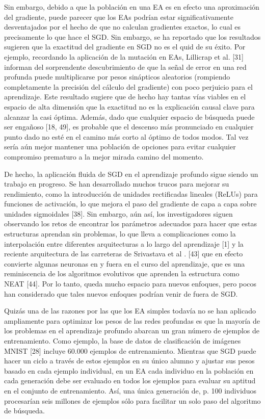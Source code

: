 Sin embargo, debido a que la población en una EA es en efecto una aproximación del gradiente, puede parecer que los EAs podrían estar significativamente desventajados por el hecho de que no calculan gradientes exactos, lo cual es precisamente lo que hace el SGD. Sin embargo, se ha reportado que los resultados sugieren que la exactitud del gradiente en SGD no es el quid de su éxito. Por ejemplo, recordando la aplicación de la mutación en EAs, Lillicrap et al. [31] informan del sorprendente descubrimiento de que la señal de error en una red profunda puede multiplicarse por pesos sinápticos aleatorios (rompiendo completamente la precisión del cálculo del gradiente) con poco perjuicio para el aprendizaje. Este resultado sugiere que de hecho hay tantas vías viables en el espacio de alta dimensión que la exactitud no es la explicación causal clave para alcanzar la casi óptima. Además, dado que cualquier espacio de búsqueda puede ser engañoso [18, 49], es probable que el descenso más pronunciado en cualquier punto dado no esté en el camino más corto al óptimo de todos modos. Tal vez sería aún mejor mantener una población de opciones para evitar cualquier compromiso prematuro a la mejor mirada camino del momento.

De hecho, la aplicación fluida de SGD en el aprendizaje profundo sigue siendo un trabajo en progreso. Se han desarrollado muchos trucos para mejorar su rendimiento, como la introducción de unidades rectificadas lineales (ReLUs) para funciones de activación, lo que mejora el paso del gradiente de capa a capa sobre unidades sigmoidales [38]. Sin embargo, aún así, los investigadores siguen observando los retos de encontrar los parámetros adecuados para hacer que estas estructuras aprendan sin problemas, lo que lleva a complicaciones como la interpolación entre diferentes arquitecturas a lo largo del aprendizaje [1] y la reciente arquitectura de las carreteras de Srivastava et al . [43] que en efecto convierte algunas neuronas en y fuera en el curso del aprendizaje, que es una reminiscencia de los algoritmos evolutivos que aprenden la estructura como NEAT [44]. Por lo tanto, queda mucho espacio para nuevos enfoques, pero pocos han considerado que tales nuevos enfoques podrían venir de fuera de SGD.

Quizás una de las razones por las que los EA simples todavía no se han aplicado ampliamente para optimizar los pesos de las redes profundas es que la mayoría de los problemas en el aprendizaje profundo abarcan un gran número de ejemplos de entrenamiento. Como ejemplo, la base de datos de clasificación de imágenes MNIST [28] incluye 60.000 ejemplos de entrenamiento. Mientras que SGD puede hacer un ciclo a través de estos ejemplos en su único alumno y ajustar sus pesos basado en cada ejemplo individual, en un EA cada individuo en la población en cada generación debe ser evaluado en todos los ejemplos para evaluar su aptitud en el conjunto de entrenamiento. Así, una única generación de, p. 100 individuos procesarían seis millones de ejemplos sólo para facilitar un solo paso del algoritmo de búsqueda.

